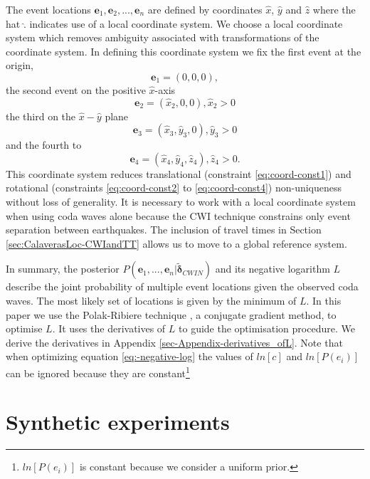 \documentclass[extra, onecolumn, doublespacing]{gji}
\begin{document}
The event locations $\mathbf{e}_1, \mathbf{e}_2, ..., \mathbf{e}_n$
are defined by coordinates $\hat{x}$, $\hat{y}$ and $\hat{z}$
where the hat $\hat{.}$ indicates use of
a local coordinate system. We choose a local coordinate system
which removes ambiguity associated with transformations of the coordinate system.
In defining this coordinate system we fix the first event at the origin,
\begin{equation}
\label{eq:coord-const1}
\mathbf{e}_1 = (0,0,0),
\end{equation}
the second event on the positive $\hat{x}$-axis
\begin{equation}
\label{eq:coord-const2}
\mathbf{e}_2 = (\hat{x}_2, 0, 0), \hat{x}_2>0
\end{equation}
the third on the $\hat{x}-\hat{y}$ plane
\begin{equation}
\label{eq:coord-const3}
\mathbf{e}_3 = (\hat{x}_3,\hat{y}_3,0), \hat{y}_3>0
\end{equation}
and the fourth to
\begin{equation}
\label{eq:coord-const4}
\mathbf{e}_4 = (\hat{x}_4,\hat{y}_4,\hat{z}_4), \hat{z}_4>0.
\end{equation}
This coordinate system reduces translational (constraint \ref{eq:coord-const1})
and rotational (constraints \ref{eq:coord-const2} to \ref{eq:coord-const4}) non-uniqueness
without loss of generality. It is necessary to work with a local coordinate
system when using coda waves alone because the CWI technique constrains only event separation
between earthquakes. The inclusion of travel times in Section \ref{sec:CalaverasLoc-CWIandTT}
allows us to move to a global reference system.

In summary, the posterior $P(\mathbf{e}_1,...,\mathbf{e}_n |
\widetilde{\mathbf{\delta}}_{CWIN})$ and its negative logarithm $L$
describe the joint probability of multiple event locations given the
observed coda waves. The most likely set of locations is given by
the minimum of $L$.   In this paper we use the Polak-Ribiere
technique \citep{dr_Press87a}, a conjugate gradient method, to
optimise $L$. It uses the derivatives of $L$ to guide the
optimisation procedure. We derive the derivatives in Appendix
\ref{sec-Appendix-derivatives_ofL}. Note that when optimizing
equation \ref{eq:-negative-log} the values of $ln \left[ c \right]$
and $ln \left[ P(e_i) \right]$ can be ignored because they are
constant\footnote{$ln \left[ P(e_i) \right]$ is constant because we
consider a uniform prior.}


\section{Synthetic experiments}
\label{sec:benchmarking}
\end{document}
